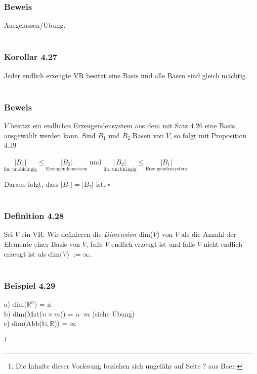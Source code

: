 \documentclass{article}
\begin{document}
\subsubsection*{Beweis}
Ausgelassen/Übung. \\
\\
\subsubsection*{Korollar 4.27}
Jeder endlich erzeugte VR besitzt eine Basis und alle Basen sind gleich mächtig. \\
\\
\subsubsection*{Beweis}
$V$ besitzt ein endliches Erzeugendensystem aus dem mit Satz 4.26 eine Basis ausgewählt werden kann. 
Sind $B_1$ und $B_2$ Basen von $V$, so folgt mit Proposition 4.19 \\
\begin{center}
    $\underset{\text{lin. unabhängig}}{|B_1|} \leq \underset{\text{Erzeugendensystem}}{|B_2|}$ und $\underset{\text{lin. unabhängig}}{|B_2|} \leq \underset{\text{Erzeugendensystem}}{|B_1|}$
\end{center}
Daraus folgt, dass $|B_1| = |B_2|$ ist. $\square$ \\
\\
\subsubsection*{Definition 4.28}
Sei $V$ ein VR. Wir definieren die \textit{Dimension} dim($V$) von $V$ als die Anzahl der Elemente einer Basis von $V$, falls $V$ endlich erzeugt ist und falls $V$ nicht endlich erzeugt ist als dim($V$) $:= \infty$. \\
\\
\subsubsection*{Beispiel 4.29}
a) dim($\mathbb{R}^n$) = n \\
b) dim(Mat($n \times m$)) = $n \cdot m$ (siehe Übung) \\
c) dim(Abb($\mathbb{N}, \mathbb{R}$)) = $\infty$\\

\date{Mittwoch, 17.01.24} \footnote[1]{Die Inhalte dieser Vorlesung beziehen sich ungefähr auf Seite ? aus Baer.}
\end{document}
